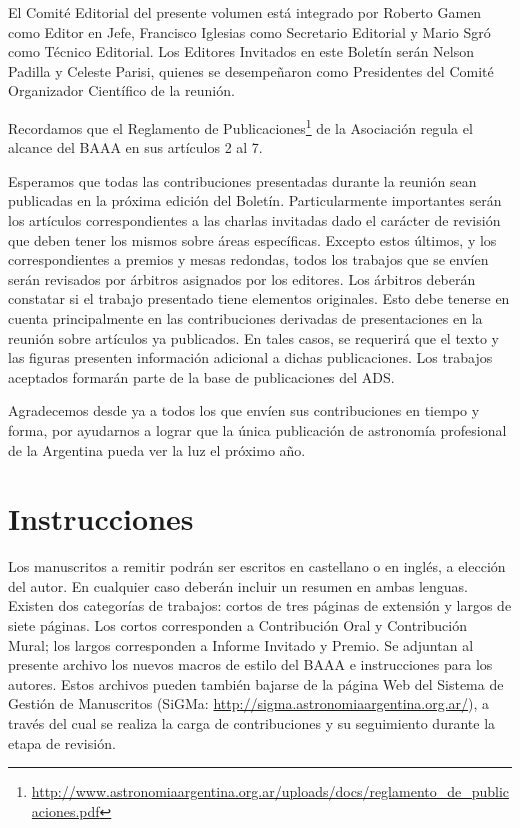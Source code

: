 \documentclass[baaa]{baaa}
\begin{document}
El Comité Editorial del presente volumen está integrado por Roberto Gamen como
Editor en Jefe, Francisco Iglesias como Secretario Editorial y Mario Sgr\'o como
Técnico Editorial. Los Editores Invitados en este Boletín serán Nelson Padilla y Celeste Parisi, 
quienes se desempeñaron como Presidentes del Comité Organizador Científico de la reunión.

Recordamos que el Reglamento de Publicaciones\footnote{\url{http://www.astronomiaargentina.org.ar/uploads/docs/reglamento_de_publicaciones.pdf}} 
de la Asociación regula el alcance del BAAA en sus artículos 2 al 7.

Esperamos que todas las contribuciones presentadas durante la reunión sean
publicadas en la próxima edición del Boletín. Particularmente importantes serán los
artículos correspondientes a las charlas invitadas dado el carácter de revisión que deben tener
los mismos sobre áreas específicas. Excepto estos últimos, y los correspondientes a
premios y mesas redondas, todos los trabajos que se envíen serán revisados por árbitros
asignados por los editores. 
%
Los árbitros deberán constatar si el trabajo presentado tiene elementos originales.  
Esto debe tenerse en cuenta principalmente en las contribuciones derivadas de presentaciones en 
la reunión sobre artículos ya publicados.  En tales casos, se requerirá que el texto y las figuras 
presenten información adicional a dichas publicaciones.
%
Los trabajos aceptados formarán parte de la base de publicaciones del ADS.
                                                                   
Agradecemos desde ya a todos los que envíen sus contribuciones en tiempo y forma, por ayudarnos a lograr
que la única publicación de astronomía profesional de la Argentina pueda ver la luz el
próximo año.
                       
 
\section{Instrucciones}

Los manuscritos a remitir podrán ser escritos en castellano o en inglés, a elección del
autor. En cualquier caso deberán incluir un resumen en ambas lenguas.
Existen dos categorías de trabajos: cortos de tres páginas de extensión y largos de siete
páginas. Los cortos corresponden a Contribución Oral y Contribución Mural; %
los largos corresponden a Informe Invitado y Premio. Se adjuntan al presente archivo los
nuevos macros de estilo del BAAA  
e instrucciones para los autores. Estos archivos pueden también bajarse de la
página Web del Sistema de Gestión de Manuscritos 
(SiGMa: \url{http://sigma.astronomiaargentina.org.ar/}), a través del cual
se realiza la carga de contribuciones y su seguimiento durante la etapa de revisión.
\end{document}

